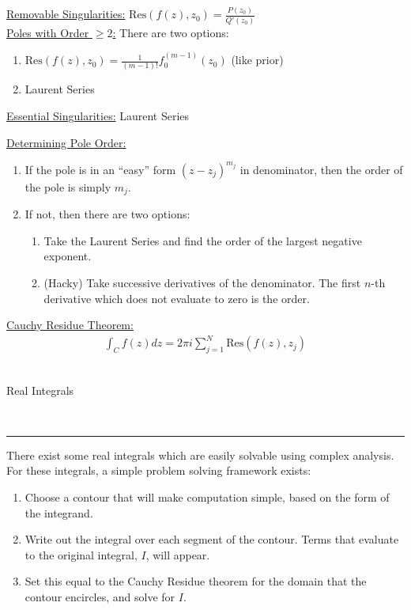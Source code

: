 \documentclass{article}
\newcommand{\header}[1]{\begin{large}\noindent #1\end{large}\\\rule{\textwidth}{0.5pt}}
\newcommand{\gap}{\medskip\\}
\newcommand{\sheader}[1]{\underline{#1:}}
\newcommand{\ds}{\displaystyle}
\begin{document}
    \begin{addmargin}[2.5em]{0em}
        \sheader{Removable Singularities} $\ds \text{Res}(f(z), z_0) = \frac{P(z_0)}{Q'(z_0)}$
        \gap
        \sheader{Poles with Order $\geq 2$} There are two options:
        \begin{enumerate}
            \item $\ds \text{Res}(f(z), z_0) = \frac{1}{(m-1)!}f_0^{(m - 1)}(z_0)$ (like prior)
            \item Laurent Series
        \end{enumerate}
        \sheader{Essential Singularities} Laurent Series
    \end{addmargin}
    \vspace{0.5cm}
    \sheader{Determining Pole Order}
    \begin{enumerate}
        \item If the pole is in an ``easy'' form $(z-z_j)^{m_j}$ in denominator, 
        then the order of the pole is simply $m_j$.
        \item If not, then there are two options:
        \begin{enumerate}
            \item Take the Laurent Series and find the order of the largest negative exponent.
            \item (Hacky) Take successive derivatives of the denominator. The first 
            $n$-th derivative which does not evaluate to zero is the order.
        \end{enumerate}
    \end{enumerate}

    \sheader{Cauchy Residue Theorem}
    \begin{align*}
        \int_C f(z)dz = 2\pi i \sum_{j = 1}^N \text{Res}(f(z), z_j)
    \end{align*}
    \gap
    \header{Real Integrals}

    There exist some real integrals which are easily solvable using complex analysis.
    For these integrals, a simple problem solving framework exists:
    \begin{enumerate}
        \item Choose a contour that will make computation simple, based on the 
        form of the integrand.
        \item Write out the integral over each segment of the contour. Terms that 
        evaluate to the original integral, $I$, will appear.
        \item Set this equal to the Cauchy Residue theorem for the domain that the 
        contour encircles, and solve for $I$.
    \end{enumerate}
\end{document}
